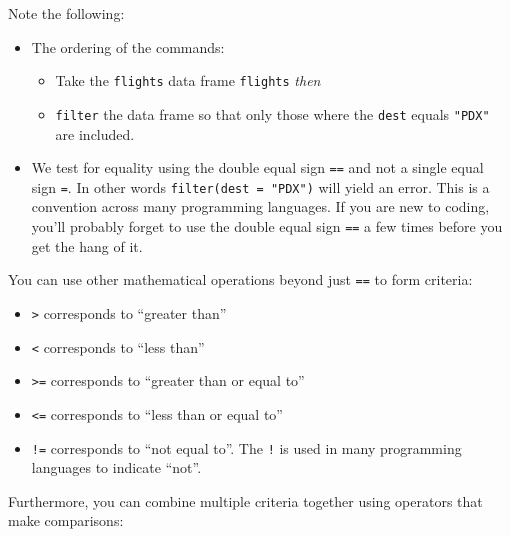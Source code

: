 \documentclass[12pt, krantz2,]{krantz}
\makeatletter
\newenvironment{Shaded}{\begin{snugshade}}{\end{snugshade}}
\newcommand{\KeywordTok}[1]{\textcolor[rgb]{0.27,0.27,0.27}{\textbf{#1}}}
\newcommand{\NormalTok}[1]{#1}
\newcommand{\OperatorTok}[1]{\textcolor[rgb]{0.43,0.43,0.43}{\textbf{#1}}}
\newcommand{\StringTok}[1]{\textcolor[rgb]{0.5,0.5,0.5}{#1}}
\providecommand{\tightlist}{%
  \setlength{\itemsep}{0pt}\setlength{\parskip}{0pt}}
\newenvironment{kframe}{%
\medskip{}
\setlength{\fboxsep}{.8em}
 \def\at@end@of@kframe{}%
 \ifinner\ifhmode%
  \def\at@end@of@kframe{\end{minipage}}%
  \begin{minipage}{\columnwidth}%
 \fi\fi%
 \def\FrameCommand##1{\hskip\@totalleftmargin \hskip-\fboxsep
 \colorbox{shadecolor}{##1}\hskip-\fboxsep
     \hskip-\linewidth \hskip-\@totalleftmargin \hskip\columnwidth}%
 \MakeFramed {\advance\hsize-\width
   \@totalleftmargin\z@ \linewidth\hsize
   \@setminipage}}%
 {\par\unskip\endMakeFramed%
 \at@end@of@kframe}
\renewenvironment{Shaded}{\begin{kframe}}{\end{kframe}}
\makeatother
\begin{document}
\begin{Shaded}
\end{Shaded}

Note the following:

\begin{itemize}
\tightlist
\item
  The ordering of the commands:

  \begin{itemize}
  \tightlist
  \item
    Take the \texttt{flights} data frame \texttt{flights} \emph{then}
  \item
    \texttt{filter} the data frame so that only those where the \texttt{dest} equals \texttt{"PDX"} are included.
  \end{itemize}
\item
  We test for equality using the double equal sign \texttt{==} and not a single equal sign \texttt{=}. In other words \texttt{filter(dest\ =\ "PDX")} will yield an error. This is a convention across many programming languages. If you are new to coding, you'll probably forget to use the double equal sign \texttt{==} a few times before you get the hang of it.
\end{itemize}

You can use other mathematical operations beyond just \texttt{==} to form criteria:

\begin{itemize}
\tightlist
\item
  \texttt{\textgreater{}} corresponds to ``greater than''
\item
  \texttt{\textless{}} corresponds to ``less than''
\item
  \texttt{\textgreater{}=} corresponds to ``greater than or equal to''
\item
  \texttt{\textless{}=} corresponds to ``less than or equal to''
\item
  \texttt{!=} corresponds to ``not equal to''. The \texttt{!} is used in many programming languages to indicate ``not''.
\end{itemize}

Furthermore, you can combine multiple criteria together using operators that make comparisons:
\end{document}
